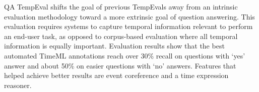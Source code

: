 QA TempEval shifts the goal of previous TempEvals away from an intrinsic evaluation methodology toward a more extrinsic goal of question answering. This evaluation requires systems to capture temporal information relevant to perform an end-user task, as opposed to corpus-based evaluation where all temporal information is equally important. Evaluation results show that the best automated TimeML annotations reach over 30\% recall on questions with ‘yes' answer and about 50\% on easier questions with ‘no' answers. Features that helped achieve better results are event coreference and a time expression reasoner.
